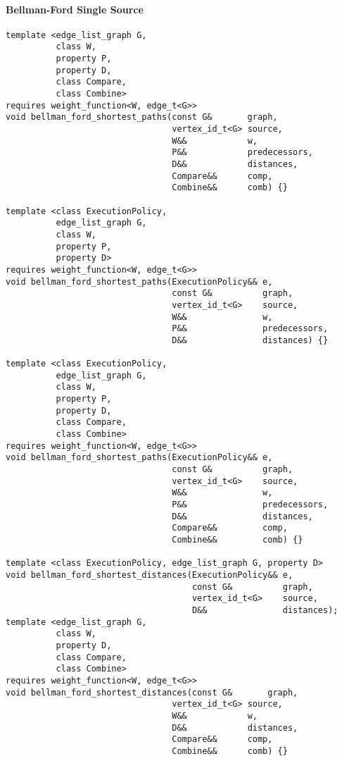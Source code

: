 \paragraph{Bellman-Ford Single Source}

\begin{lstlisting}
template <edge_list_graph G,
          class W,
          property P,
          property D,
          class Compare,
          class Combine>
requires weight_function<W, edge_t<G>>
void bellman_ford_shortest_paths(const G&       graph,
                                 vertex_id_t<G> source,
                                 W&&            w,
                                 P&&            predecessors,
                                 D&&            distances,
                                 Compare&&      comp,
                                 Combine&&      comb) {}

template <class ExecutionPolicy,
          edge_list_graph G,
          class W,
          property P,
          property D>
requires weight_function<W, edge_t<G>>
void bellman_ford_shortest_paths(ExecutionPolicy&& e,
                                 const G&          graph,
                                 vertex_id_t<G>    source,
                                 W&&               w,
                                 P&&               predecessors,
                                 D&&               distances) {}

template <class ExecutionPolicy,
          edge_list_graph G,
          class W,
          property P,
          property D,
          class Compare,
          class Combine>
requires weight_function<W, edge_t<G>>
void bellman_ford_shortest_paths(ExecutionPolicy&& e,
                                 const G&          graph,
                                 vertex_id_t<G>    source,
                                 W&&               w,
                                 P&&               predecessors,
                                 D&&               distances,
                                 Compare&&         comp,
                                 Combine&&         comb) {}

template <class ExecutionPolicy, edge_list_graph G, property D>
void bellman_ford_shortest_distances(ExecutionPolicy&& e,
                                     const G&          graph,
                                     vertex_id_t<G>    source,
                                     D&&               distances);
template <edge_list_graph G,
          class W,
          property D,
          class Compare,
          class Combine>
requires weight_function<W, edge_t<G>>
void bellman_ford_shortest_distances(const G&       graph,
                                 vertex_id_t<G> source,
                                 W&&            w,
                                 D&&            distances,
                                 Compare&&      comp,
                                 Combine&&      comb) {}


\end{lstlisting}
